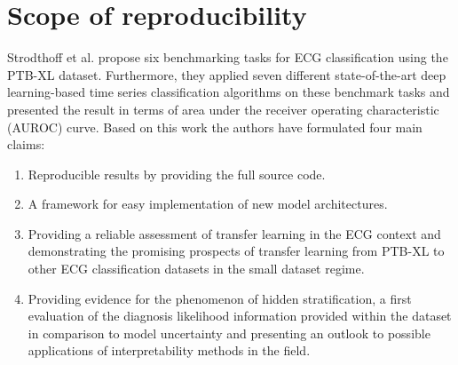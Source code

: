 \section{Scope of reproducibility}
\label{sec:claims}




Strodthoff et al. propose six benchmarking tasks for ECG classification using the PTB-XL dataset. Furthermore, they applied seven different state-of-the-art deep learning-based time series classification algorithms on these benchmark tasks and presented the result in terms of area under the receiver operating characteristic (AUROC) curve. Based on this work the authors have formulated four main claims: 
\begin{enumerate}
\setlength{\itemsep}{0pt}
    \item Reproducible results by providing the full source code.
    \item A framework for easy implementation of new model architectures.
    \item Providing a reliable assessment of transfer learning in the ECG context and demonstrating the promising prospects of transfer learning from PTB-XL to other ECG classification datasets in the small dataset regime.
    \item Providing evidence for the phenomenon of hidden stratification, a first evaluation of the diagnosis likelihood information provided within the dataset in comparison to model uncertainty and presenting an outlook to possible applications of interpretability methods in the field.
\end{enumerate}

